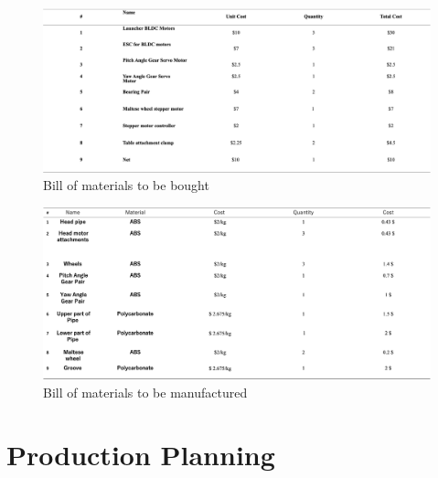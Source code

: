 \documentclass[12pt]{report}
\begin{document}
\begin{appendices}
\begin{figure}[H]
    \centering
    \includegraphics[width=\textwidth]{Bill of materials 1.png} 
    \caption{Bill of materials to be bought}
    \label{fig:bill-of-materials}
\end{figure}

\begin{figure}[H]
    \centering
    \includegraphics[width=\textwidth]{Bill of materials 2.png} %
    \caption{Bill of materials to be manufactured}
    \label{fig:bill-of-materials}
\end{figure}
\section{Production Planning}


\end{appendices}
\end{document}
